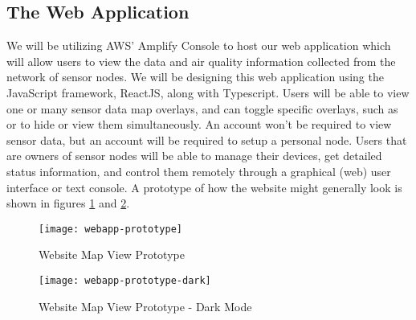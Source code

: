 \subsection{The Web Application}
We will be utilizing AWS' Amplify Console to host our web application which will allow users to view
the data and air quality information collected from the network of sensor nodes. We will be
designing this web application using the JavaScript framework, ReactJS, along with Typescript. Users
will be able to view one or many sensor data map overlays, and can toggle specific overlays, such as
\sdo or \ndo to hide or view them simultaneously. An account won't be required to view sensor data,
but an account will be required to setup a personal node. Users that are owners of sensor nodes will
be able to manage their devices, get detailed status information, and control them remotely through
a graphical (web) user interface or text console. A prototype of how the website might generally
look is shown in figures \ref{fig:website-prototype-map} and \ref{fig:website-prototype-map-dark}. 

\begin{figure}
    \centering
    \texttt{[image: webapp-prototype]}
    \caption{Website Map View Prototype}
    \label{fig:website-prototype-map} 
\end{figure}

\begin{figure}
    \centering
    \texttt{[image: webapp-prototype-dark]}
    \caption{Website Map View Prototype - Dark Mode}
    \label{fig:website-prototype-map-dark} 
\end{figure}
